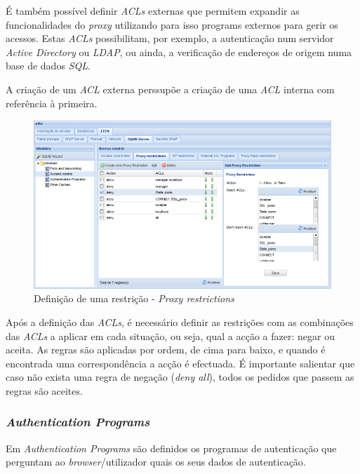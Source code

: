 É também possível definir \textit{ACLs} externas que permitem expandir as funcionalidades do \textit{proxy} utilizando para isso programs externos para gerir os acessos.
Estas \textit{ACLs} possibilitam, por exemplo, a autenticação num servidor \textit{Active Directory} ou \textit{LDAP}, ou ainda, a verificação de endereços de origem numa base de dados \textit{SQL}.

A criação de um \textit{ACL} externa perssupõe a criação de uma \textit{ACL} interna com referência à primeira.

\begin{figure}[H]
    \begin{center}
    \includegraphics[scale=0.38]{screenshots/etfw/etfw_squid_accesscontrol_04.png}
    \caption{Definição de uma restrição - \textit{Proxy restrictions}}
    \label{fig:etfw_squid_accesscontrol_04}
    \end{center}
\end{figure}

Após a definição das \textit{ACLs}, é necessário definir as restrições com as combinações das \textit{ACLs} a aplicar em cada situação, ou seja, qual a acção a fazer: negar ou aceita.
As regras são aplicadas por ordem, de cima para baixo, e quando é encontrada uma correspondência a acção é efectuada.
É importante salientar que caso não exista uma regra de negação (\textit{deny all}), todos os pedidos que passem as regras são aceites.

\subsubsection{\textit{Authentication Programs}}

Em \textit{Authentication Programs} são definidos os programas de autenticação que perguntam ao \textit{browser}/utilizador quais os seus dados de autenticação.


